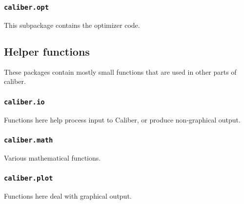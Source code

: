 \subsubsection{\texttt{caliber.opt}}
This subpackage contains the optimizer code.

\subsection{Helper functions}
These packages contain mostly small functions that are used in other parts of caliber.
\subsubsection{\texttt{caliber.io}}
Functions here help process input to Caliber, or produce non-graphical output.
\subsubsection{\texttt{caliber.math}}
Various mathematical functions.
\subsubsection{\texttt{caliber.plot}}
Functions here deal with graphical output.
